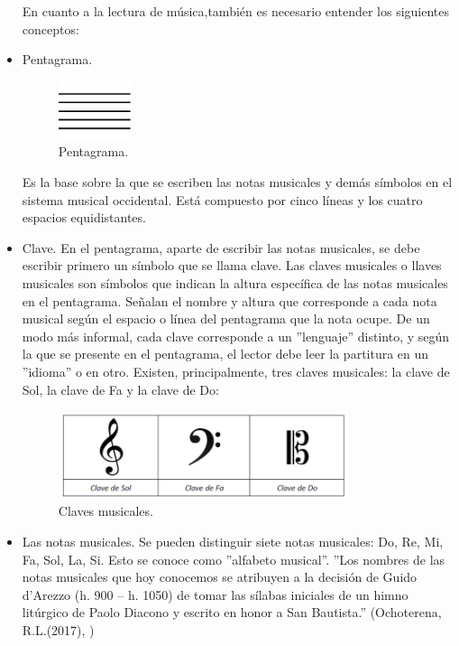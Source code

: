 \documentclass[a4paper, openright, 11pt, titlepage]{report}
\theoremstyle{definition}\newtheorem{defin}[propo]{Definition}
\theoremstyle{definition}\newtheorem{obser}[propo]{Remark}
\theoremstyle{definition}\newtheorem{ejem}[propo]{Ejemplo}
\theoremstyle{definition}\newtheorem{algoritmo}[propo]{Algoritmo}
\begin{document}
\begin{itemize}
    En cuanto a la lectura de música,también es necesario entender los siguientes conceptos:
    \item Pentagrama. 
   \begin{figure}[H]
        \begin{center}
            \includegraphics[width=0.2\textwidth]{Images/Apéndices/Apéndice A/penta.png}
        \end{center}
        \caption{Pentagrama.}
    \end{figure}
    Es la base sobre la que se escriben las notas musicales y demás símbolos en el sistema musical occidental. Está compuesto por cinco líneas y los cuatro espacios equidistantes.
    \item Clave. En el pentagrama, aparte de escribir las notas musicales, se debe escribir primero un símbolo que se llama clave.
    Las claves musicales o llaves musicales son símbolos que indican la altura específica de las notas musicales en el pentagrama. Señalan el nombre y altura que corresponde a cada nota musical según el espacio o línea del pentagrama que la nota ocupe. De un modo más informal, cada clave corresponde a un ''lenguaje'' distinto, y según la que se presente en el pentagrama, el lector debe leer la partitura en un ''idioma'' o en otro. Existen, principalmente, tres claves musicales: la clave de Sol, la clave de Fa y la clave de Do:
    \begin{figure}[H]
        \centering
        \includegraphics[width = 0.8\textwidth]{Images/Apéndices/Apéndice A/claves.png}
        \caption{Claves musicales.}
    \end{figure}
    \item Las notas musicales. Se pueden distinguir siete notas musicales: Do, Re, Mi, Fa, Sol, La, Si. Esto se conoce como ''alfabeto musical''. ''Los nombres de las notas musicales que hoy conocemos se atribuyen a la decisión de Guido d’Arezzo (h. 900 – h. 1050) de tomar las sílabas iniciales de un himno litúrgico de Paolo Diacono y escrito en honor a San Bautista.'' (Ochoterena, R.L.(2017), \cite{alfabeto})

\end{itemize}
\end{document}
